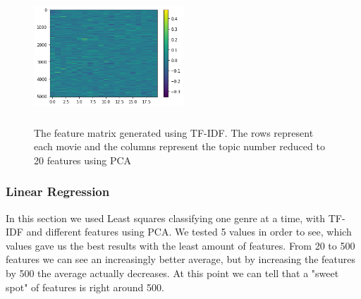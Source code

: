 \documentclass[11pt]{article}
\begin{document}

\begin{figure}[ht]
	\centering
		\includegraphics[width=0.5\textwidth,height=5cm]{TF-IDF.png}
	\caption{The feature matrix generated using TF-IDF. The rows represent each movie and the columns represent the topic number reduced to 20 features using PCA}
	\label{fig:lda}
\end{figure}

\label{sec:tfidf}

\subsubsection{Linear Regression}

In this section we used Least squares classifying one genre at a time, with TF-IDF and different features using PCA. We tested 5 values in order to see, which values gave us the best results with the least amount of features. From 20 to 500 features we can see an increasingly better average, but by increasing the features by 500 the average actually decreases. At this point we can tell that a "sweet spot" of features is right around 500.
\end{document}
